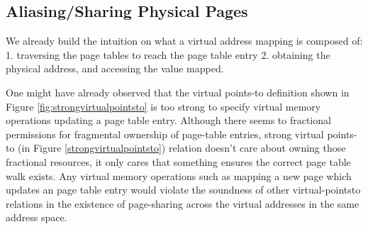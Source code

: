   \subsection{Aliasing/Sharing Physical Pages}
  \label{sec:sharingpages}
  We already build the intuition on what a virtual address mapping is composed of: 1. traversing the page tables to reach the page table entry 2. obtaining the physical address, and accessing the value mapped.
  
One might have already observed that the virtual points-to definition shown in Figure \ref{fig:strongvirtualpointsto} is too strong to specify virtual memory operations updating a page table entry. Although there seems to fractional permissions for fragmental ownership of page-table entries, strong virtual points-to (in Figure \ref{strongvirtualpointsto}) relation doesn’t care about owning those fractional resources, it only cares that something ensures the correct page table walk exists. Any virtual memory operations such as mapping a new page which updates an page table entry would violate the soundness of other virtual-pointsto relations in the existence of page-sharing across the virtual addresses in the same address space. 

